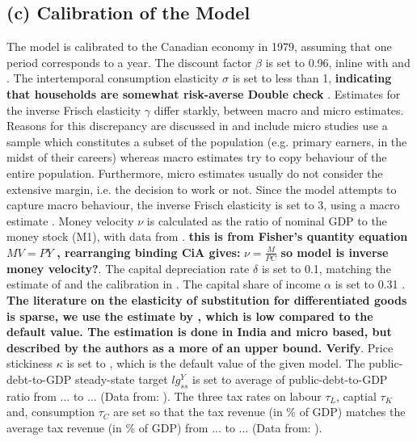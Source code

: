 \documentclass[12pt]{article}
\begin{document}
\subsection*{(c) Calibration of the Model}
The model is calibrated to the Canadian economy in 1979, assuming that one period corresponds to a year. 
The discount factor $\beta$ is set to 0.96, inline with \cite{...} and \cite {...}. 
The intertemporal consumption elasticity $\sigma$ is set to less than 1, \textbf{indicating that households are somewhat risk-averse Double check} \cite{...}.
Estimates for the inverse Frisch elasticity $\gamma$ differ starkly, between macro and micro estimates. Reasons for this discrepancy are discussed in \cite{...} and 
include micro studies use a sample which constitutes a subset of the population (e.g. primary earners, in the midst of their careers) whereas macro estimates try
 to copy behaviour of the entire population. Furthermore, micro estimates usually do not consider the extensive margin, i.e. the decision to work or not. Since the model attempts to capture
macro behaviour, the inverse Frisch elasticity is set to 3, using a macro estimate \cite{...}. Money velocity $\nu$ is calculated as the ratio of nominal GDP to the money stock (M1), with data from \cite{...}.
\textbf{this is from Fisher's quantity equation} $MV =PY$ \textbf{, rearranging binding CiA gives: }$\nu = \frac{M}{PC}$ \textbf{so model is inverse money velocity?}.
The capital depreciation rate $\delta$ is set to 0.1, matching the estimate of \cite{...} and the calibration in \cite{...}.
The capital share of income $\alpha$ is set to 0.31 \cite{...}. 
\textbf{The literature on the elasticity of substitution for differentiated goods is sparse, we use the estimate by \cite{...}, which is low compared to the default value. The estimation is done in India and 
micro based, but described by the authors as a more of an upper bound. Verify}. 
Price stickiness $\kappa$ is set to , which is the default value of the given model.
The public-debt-to-GDP steady-state target $lg^Y_{ss}$ is set to average of public-debt-to-GDP ratio from ... to ... (Data from: \cite{...}).
The three tax rates on labour $\tau_L$, captial $\tau_K$ and, consumption $\tau_C$ are set so that the tax revenue (in \% of GDP) matches the average tax revenue (in \% of GDP) from ... to ... (Data from: \cite{...}).


\end{document}
